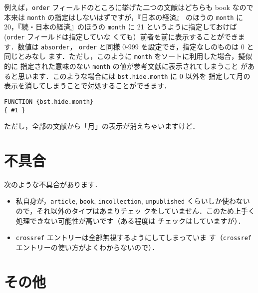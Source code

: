 \documentclass[article]{jlreq}
\begin{document}
例えば，\texttt{order} フィールドのところに挙げた二つの文献はどちらも 
book なので本来は \texttt{month} の指定はしないはずですが，『日本の経済』
のほうの \texttt{month} に 20，『続・日本の経済』のほうの \texttt{month} 
に 21 というように指定しておけば(\texttt{order} フィールドは指定していな
くても）前者を前に表示することができます．数値は \texttt{absorder}，
\texttt{order} と同様 0-999 を設定でき，指定なしのものは 0 と同じとみなし
ます．ただし，このように \texttt{month} をソートに利用した場合，擬似的に
指定された意味のない \texttt{month} の値が参考文献に表示されてしまうこと
があると思います．このような場合には \texttt{bst.hide.month} に 0 以外を
指定して月の表示を消してしまうことで対処することができます．
\begin{screen}
\begin{verbatim}
FUNCTION {bst.hide.month}
{ #1 }
\end{verbatim}
\end{screen}
ただし，全部の文献から「月」の表示が消えちゃいますけど．


\section{不具合}

次のような不具合があります．

\begin{itemize}
 \item 私自身が，\texttt{article}, \texttt{book}, \texttt{incollection},
       \texttt{unpublished} くらいしか使わないので，それ以外のタイプはあまりチェッ
       クをしていません．このため上手く処理できない可能性が高いです（ある程度は
       チェックはしていますが）．
 \item \texttt{crossref} エントリーは全部無視するようにしてしまっていま
       す（\texttt{crossref} エントリーの使い方がよくわからないので）．
\end{itemize}

\section{その他}
\end{document}
